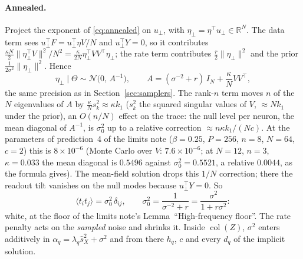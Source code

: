 \documentclass[11pt,a4paper]{article}
\newcommand{\R}{\mathbb R}
\newcommand{\col}{\operatorname{col}}
\newcommand{\sX}{\hat s_X^2}
\theoremstyle{remark}
\begin{document}
\paragraph{Annealed.}
Project the exponent of \eqref{eq:annealed} on $u_\perp$, with
$\eta_\perp = \eta^\top u_\perp\in\R^N$. The data term sees
$u_\perp^\top F = u_\perp^\top\eta V/N$ and $u_\perp^\top Y = 0$, so it
contributes $\frac{\kappa N}{2}\|\eta_\perp^\top V\|^2/N^2 = \frac{\kappa}{2N}\eta_\perp^\top VV^\top\eta_\perp$;
the rate term contributes $\frac r2\|\eta_\perp\|^2$ and the prior
$\frac1{2\sigma^2}\|\eta_\perp\|^2$. Hence
\begin{equation}
  \eta_\perp\mid\Theta\sim\mathcal N\big(0,\,A^{-1}\big),\qquad
  A = (\sigma^{-2} + r)\,I_N + \frac{\kappa}{N}VV^\top ,
  \label{eq:null-annealed}
\end{equation}
the same precision as in Section~\ref{sec:samplers}. The rank-$n$ term moves
$n$ of the $N$ eigenvalues of $A$ by $\frac\kappa Ns_k^2\approx\kappa k_1$
($s_k^2$ the squared singular values of $V$, $\approx Nk_1$ under the prior),
an $O(n/N)$ effect on the trace: the null level per neuron, the mean
diagonal of $A^{-1}$, is $\sigma_0^2$ up to a relative correction
$\approx n\kappa k_1/(Nc)$. At the parameters of prediction~4 of the limits
note ($\beta = 0.25$, $P = 256$, $n = 8$, $N = 64$, $c = 2$) this is
$8\times10^{-6}$ (Monte Carlo over $V$: $7.6\times10^{-6}$; at $N = 12$,
$n = 3$, $\kappa = 0.033$ the mean diagonal is $0.5496$ against
$\sigma_0^2 = 0.5521$, a relative $0.0044$, as the formula gives). The
mean-field solution drops this $1/N$ correction; there the readout tilt
vanishes on the null modes because $u_\perp^\top Y = 0$. So
\begin{equation}
  \langle t_i t_j\rangle = \sigma_0^2\,\delta_{ij},\qquad
  \sigma_0^2 = \frac{1}{\sigma^{-2} + r} = \frac{\sigma^2}{1 + r\sigma^2}:
\end{equation}
white, at the floor of the limits note's Lemma~``High-frequency floor''.
The rate penalty acts on the \emph{sampled} noise and shrinks it. Inside
$\col(Z)$, $\sigma^2$ enters additively in $\alpha_q = \lambda_q\sX + \sigma^2$
and from there $h_q$, $c$ and every $d_q$ of the implicit solution.
\end{document}
